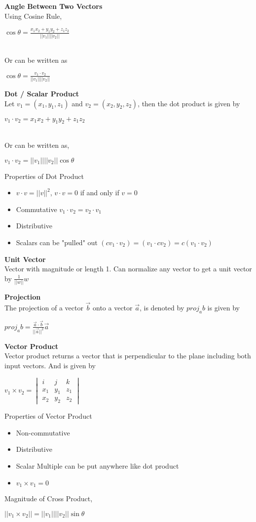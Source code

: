 \documentclass[10pt, a4paper]{article}
\begin{document}
\begin{multicols*}{3}
	\textbf{Angle Between Two Vectors}\\
	Using Cosine Rule,\\
	\centerline{$\cos{\theta} = \frac{x_1x_2 + y_1y_2 + z_1z_2}{||v_1||||v_2||}$}\\
	Or can be written as\\
	\centerline{$\cos{\theta} = \frac{v_1 \cdot v_2}{||v_1||||v_2||}$}
	
	\textbf{Dot / Scalar Product}\\
	Let $v_1 = (x_1, y_1, z_1)$ and $v_2 = (x_2, y_2, z_2)$, then the dot product is given by\\
	\centerline{$v_1 \cdot v_2 = x_1x_2 + y_1y_2 + z_1z_2$}\\
	Or can be written as, \\
	\centerline{$v_1 \cdot v_2 = ||v_1||||v_2||\cos{\theta}$}
	Properties of Dot Product
	\begin{itemize}
		\setlength\itemsep{0em}
		\item $v \cdot v = ||v||^2$, $v \cdot v = 0$ if and only if $v = 0$
		\item Commutative $v_1 \cdot v_2 = v_2 \cdot v_1$
		\item Distributive 
		\item Scalars can be "pulled" out $(cv_1 \cdot v_2) = (v_1 \cdot cv_2) =  c(v_1 \cdot v_2)$
	\end{itemize}

	\textbf{Unit Vector}\\
	Vector with magnitude or length 1.
	Can normalize any vector to get a unit vector by $\frac{1}{||w||} w$
	
	\textbf{Projection}\\
	The projection of a vector $\overrightarrow{b}$ onto a vector $\overrightarrow{a}$, is denoted by $proj_a b$ is given by \\
	\centerline{$proj_a b = \frac{\overrightarrow{a} \cdot \overrightarrow{b}}{||\overrightarrow{a}||^2} \overrightarrow{a}$}
	
	\textbf{Vector Product }\\
	Vector product returns a vector that is perpendicular to the plane including both input vectors. And is given by\\
	\centerline{$v_1 \times v_2 = \begin{vmatrix} i & j & k \\ x_1 & y_1 & z_1 \\ x_2 & y_2 & z_2 \end{vmatrix}$}
	Properties of Vector Product
	\begin{itemize}
		\setlength\itemsep{0em}
		\item Non-commutative
		\item Distributive
		\item Scalar Multiple can be put anywhere like dot product
		\item $v_1 \times v_1 = 0$
	\end{itemize}
	Magnitude of Cross Product,\\
	\centerline{$||v_1 \times v_2 || = ||v_1||||v_2||\sin{\theta}$}
	

\end{multicols*}
\end{document}
